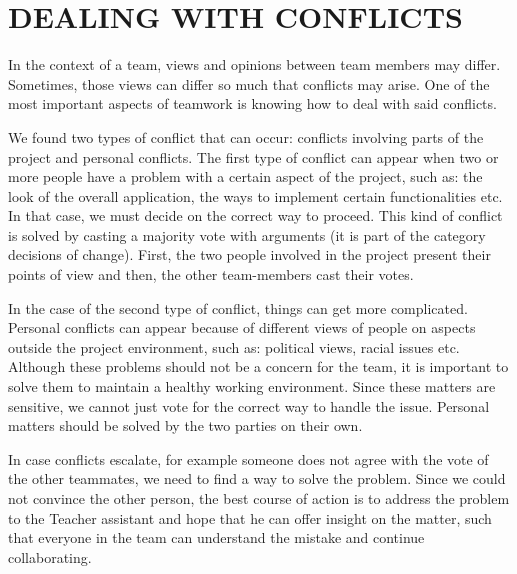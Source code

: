 \section{DEALING WITH CONFLICTS}
In the context of a team, views and opinions between team members may differ. Sometimes, those views can differ so much that conflicts may arise. One of the most important aspects of teamwork is knowing how to deal with said conflicts.\par 
\smallskip
We found two types of conflict that can occur: conflicts involving parts of the project and personal conflicts. The first type of conflict can appear when two or more people have a problem with a certain aspect of the project, such as: the look of the overall application, the ways to implement certain functionalities etc. In that case, we must decide on the correct way to proceed. This kind of conflict is solved by casting a majority vote with arguments (it is part of the category decisions of change). First, the two people involved in the project present their points of view and then, the other team-members cast their votes. \par
\smallskip
In the case of the second type of conflict, things can get more complicated. Personal conflicts can appear because of different views of people on aspects outside the project environment, such as: political views, racial issues etc. Although these problems should not be a concern for the team, it is important to solve them to maintain a healthy working environment. Since these matters are sensitive, we cannot just vote for the correct way to handle the issue. Personal matters should be solved by the two parties on their own. \par
\smallskip
In case conflicts escalate, for example someone does not agree with the vote of the other teammates, we need to find a way to solve the problem. Since we could not convince the other person, the best course of action is to address the problem to the Teacher assistant and hope that he can offer insight on the matter, such that everyone in the team can understand the mistake and continue collaborating.\par 

